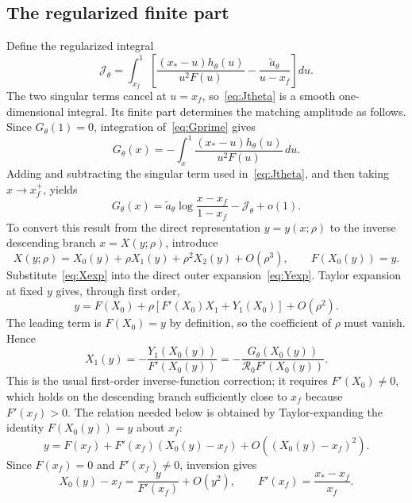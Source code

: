 \documentclass[11pt,a4paper]{article}
\newcommand{\Rzero}{\mathcal R_0}
\newcommand{\Jfun}{\mathcal J_\theta}
\newcommand{\xf}{x_f}
\newcommand{\xs}{x_*}
\begin{document}
\subsection{The regularized finite part}
Define the regularized integral
\begin{equation}
\label{eq:Jtheta}
\Jfun
=\int_{\xf}^{1}
\left[
\frac{(\xs-u)h_\theta(u)}{u^2F(u)}
-\frac{\widetilde a_\theta}{u-\xf}
\right]du.
\end{equation}
The two singular terms cancel at $u=\xf$, so~\eqref{eq:Jtheta} is a smooth one-dimensional integral. Its finite part determines the matching amplitude as follows. Since $G_\theta(1)=0$, integration of~\eqref{eq:Gprime} gives
\begin{equation}
\label{eq:Gintegral}
G_\theta(x)=-\int_x^1
\frac{(\xs-u)h_\theta(u)}{u^2F(u)}\,du.
\end{equation}
Adding and subtracting the singular term used in~\eqref{eq:Jtheta}, and then taking $x\to\xf^+$, yields
\begin{equation}
\label{eq:Gfinitepart}
G_\theta(x)
=\widetilde a_\theta\log\frac{x-\xf}{1-\xf}
-\Jfun+o(1).
\end{equation}
To convert this result from the direct representation $y=y(x;\rho)$ to the
inverse descending branch $x=X(y;\rho)$, introduce
\begin{equation}
\label{eq:Xexp}
X(y;\rho)=X_0(y)+\rho X_1(y)+\rho^2X_2(y)+O(\rho^3),
\qquad F(X_0(y))=y.
\end{equation}
Substitute~\eqref{eq:Xexp} into the direct outer expansion~\eqref{eq:Yexp}.
Taylor expansion at fixed $y$ gives, through first order,
\[
y
=F(X_0)+\rho\left[F'(X_0)X_1+Y_1(X_0)\right]
+O(\rho^2).
\]
The leading term is $F(X_0)=y$ by definition, so the coefficient of $\rho$
must vanish. Hence
\begin{equation}
\label{eq:X1}
X_1(y)=-\frac{Y_1(X_0(y))}{F'(X_0(y))}
=-\frac{G_\theta(X_0(y))}{\Rzero F'(X_0(y))}.
\end{equation}
This is the usual first-order inverse-function correction; it requires
$F'(X_0)\ne0$, which holds on the descending branch sufficiently close to
$\xf$ because $F'(\xf)>0$. The relation needed below is obtained by
Taylor-expanding the identity $F(X_0(y))=y$ about $\xf$:
\[
y=F(\xf)+F'(\xf)(X_0(y)-\xf)
+O\!\left((X_0(y)-\xf)^2\right).
\]
Since $F(\xf)=0$ and $F'(\xf)\ne0$, inversion gives
\begin{equation}
\label{eq:X0nearxf}
X_0(y)-\xf
=\frac{y}{F'(\xf)}+O(y^2),
\qquad
F'(\xf)=\frac{\xs-\xf}{\xf}.
\end{equation}
\end{document}
